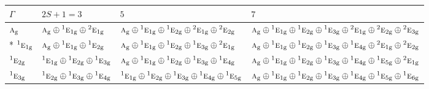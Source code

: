 \documentclass[10pt,a4paper]{article}
\numberwithin{equation}{section}
\newcommand{\irr}[1]{\text{\normalfont\scshape #1}}
\newcommand{\conjpair}[1]{{}^{#1}}
\newcommand{\ptag}[1]{\mathrm{#1}}
\begin{document}
{\small\setlength{\tabcolsep}{3pt}\begin{longtable}{@{}l>{\RaggedRight\arraybackslash}p{}>{\RaggedRight\arraybackslash}p{}>{\RaggedRight\arraybackslash}p{}@{}}\toprule
$\Gamma$ & $2S + 1 = 3$ & $5$ & $7$\\\midrule\endhead
\bottomrule\endfoot\endlastfoot
$\irr{a}_{\ptag{g}}$ & $\irr{a}_{\ptag{g}}\oplus \conjpair{1}\irr{e}_{1\ptag{g}}\oplus \conjpair{2}\irr{e}_{1\ptag{g}}$ & $\irr{a}_{\ptag{g}}\oplus \conjpair{1}\irr{e}_{1\ptag{g}}\oplus \conjpair{1}\irr{e}_{2\ptag{g}}\oplus \conjpair{2}\irr{e}_{1\ptag{g}}\oplus \conjpair{2}\irr{e}_{2\ptag{g}}$ & $\irr{a}_{\ptag{g}}\oplus \conjpair{1}\irr{e}_{1\ptag{g}}\oplus \conjpair{1}\irr{e}_{2\ptag{g}}\oplus \conjpair{1}\irr{e}_{3\ptag{g}}\oplus \conjpair{2}\irr{e}_{1\ptag{g}}\oplus \conjpair{2}\irr{e}_{2\ptag{g}}\oplus \conjpair{2}\irr{e}_{3\ptag{g}}$\\*
$\conjpair{1}\irr{e}_{1\ptag{g}}$ & $\irr{a}_{\ptag{g}}\oplus \conjpair{1}\irr{e}_{1\ptag{g}}\oplus \conjpair{1}\irr{e}_{2\ptag{g}}$ & $\irr{a}_{\ptag{g}}\oplus \conjpair{1}\irr{e}_{1\ptag{g}}\oplus \conjpair{1}\irr{e}_{2\ptag{g}}\oplus \conjpair{1}\irr{e}_{3\ptag{g}}\oplus \conjpair{2}\irr{e}_{1\ptag{g}}$ & $\irr{a}_{\ptag{g}}\oplus \conjpair{1}\irr{e}_{1\ptag{g}}\oplus \conjpair{1}\irr{e}_{2\ptag{g}}\oplus \conjpair{1}\irr{e}_{3\ptag{g}}\oplus \conjpair{1}\irr{e}_{4\ptag{g}}\oplus \conjpair{2}\irr{e}_{1\ptag{g}}\oplus \conjpair{2}\irr{e}_{2\ptag{g}}$\\
$\conjpair{1}\irr{e}_{2\ptag{g}}$ & $\conjpair{1}\irr{e}_{1\ptag{g}}\oplus \conjpair{1}\irr{e}_{2\ptag{g}}\oplus \conjpair{1}\irr{e}_{3\ptag{g}}$ & $\irr{a}_{\ptag{g}}\oplus \conjpair{1}\irr{e}_{1\ptag{g}}\oplus \conjpair{1}\irr{e}_{2\ptag{g}}\oplus \conjpair{1}\irr{e}_{3\ptag{g}}\oplus \conjpair{1}\irr{e}_{4\ptag{g}}$ & $\irr{a}_{\ptag{g}}\oplus \conjpair{1}\irr{e}_{1\ptag{g}}\oplus \conjpair{1}\irr{e}_{2\ptag{g}}\oplus \conjpair{1}\irr{e}_{3\ptag{g}}\oplus \conjpair{1}\irr{e}_{4\ptag{g}}\oplus \conjpair{1}\irr{e}_{5\ptag{g}}\oplus \conjpair{2}\irr{e}_{1\ptag{g}}$\\
$\conjpair{1}\irr{e}_{3\ptag{g}}$ & $\conjpair{1}\irr{e}_{2\ptag{g}}\oplus \conjpair{1}\irr{e}_{3\ptag{g}}\oplus \conjpair{1}\irr{e}_{4\ptag{g}}$ & $\conjpair{1}\irr{e}_{1\ptag{g}}\oplus \conjpair{1}\irr{e}_{2\ptag{g}}\oplus \conjpair{1}\irr{e}_{3\ptag{g}}\oplus \conjpair{1}\irr{e}_{4\ptag{g}}\oplus \conjpair{1}\irr{e}_{5\ptag{g}}$ & $\irr{a}_{\ptag{g}}\oplus \conjpair{1}\irr{e}_{1\ptag{g}}\oplus \conjpair{1}\irr{e}_{2\ptag{g}}\oplus \conjpair{1}\irr{e}_{3\ptag{g}}\oplus \conjpair{1}\irr{e}_{4\ptag{g}}\oplus \conjpair{1}\irr{e}_{5\ptag{g}}\oplus \conjpair{1}\irr{e}_{6\ptag{g}}$\\

\end{longtable}}
\end{document}
